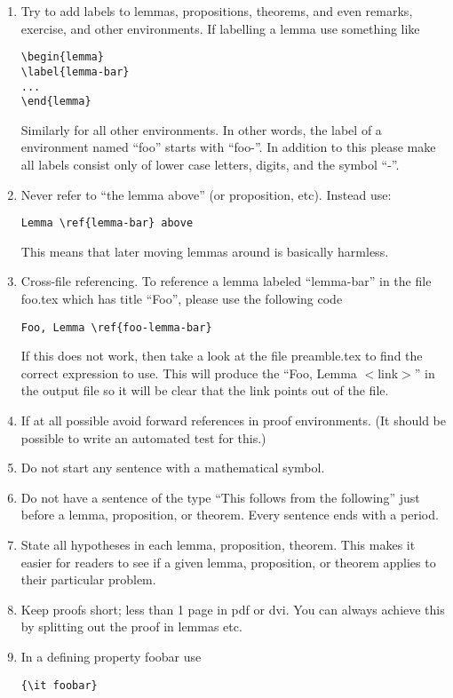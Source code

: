 \begin{enumerate}
\begin{verbatim}
\end{verbatim}
\item Try to add labels to lemmas, propositions, theorems, and even
remarks, exercise, and other environments.
If labelling a lemma use something like
\begin{verbatim}
\begin{lemma}
\label{lemma-bar}
...
\end{lemma}
\end{verbatim}
Similarly for all other environments. In other words, the label
of a environment named ``foo'' starts with ``foo-''. In addition to
this please make all labels consist only of lower case letters,
digits, and the symbol ``-''.
\item Never refer to ``the lemma above'' (or proposition, etc).
Instead use:
\begin{verbatim}
Lemma \ref{lemma-bar} above
\end{verbatim}
This means that later
moving lemmas around is basically harmless.
\item Cross-file referencing. To reference a lemma labeled
``lemma-bar'' in the file foo.tex which has title
``Foo'', please use the following code
\begin{verbatim}
Foo, Lemma \ref{foo-lemma-bar}
\end{verbatim}
If this does not work, then take a look at the file
preamble.tex to find the correct expression to use.
This will produce the ``Foo, Lemma $<$link$>$'' in the
output file so it will be clear that the link points
out of the file.
\item If at all possible avoid forward references in proof
environments. (It should be possible to write an automated
test for this.)
\item Do not start any sentence with a mathematical symbol.
\item Do not have a sentence of the type ``This follows from
the following'' just before a lemma, proposition, or theorem.
Every sentence ends with a period.
\item State all hypotheses in each lemma, proposition, theorem.
This makes it easier for readers to see if a given
lemma, proposition, or theorem applies to their particular
problem.
\item Keep proofs short; less than 1 page in pdf or dvi.
You can always achieve this by splitting out the proof in lemmas
etc.
\item In a defining property foobar use
\begin{verbatim}
{\it foobar}

\end{verbatim}
\end{enumerate}
